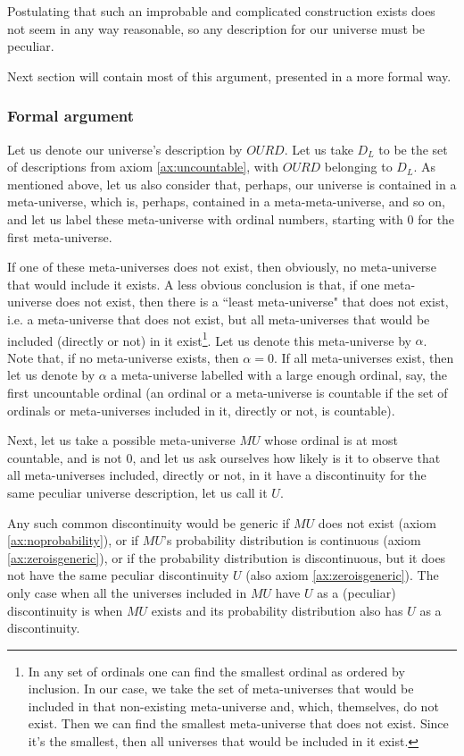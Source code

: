 \documentclass[a4paper
,draft
]{article}
\def\descriptions{D_L}
\def\our_description{OURD}
\newcommand{\ghilimele}[1]{``#1"}
\begin{document}
Postulating that such an improbable and complicated construction exists does
not seem in any way reasonable,
so any description for our universe must be peculiar.

Next section will contain most of this argument, presented in a more formal way.

\subsubsection{Formal argument}

Let us denote our universe's description by
$\our_description$. Let us take $\descriptions$ to be the set of descriptions from
axiom \ref{ax:uncountable}, with $\our_description$ belonging to $\descriptions$.
As mentioned above, let us also consider that, perhaps, our universe is
contained in a meta-universe, which is, perhaps, contained in
a meta-meta-universe, and so on, and let us label these meta-universe
with ordinal numbers, starting with $0$ for the first meta-universe.

If one of these meta-universes does not exist, then obviously, no meta-universe
that would include it exists. A less obvious conclusion is that, if one
meta-universe does not exist, then there is a \ghilimele{least meta-universe}
that does not exist, i.e. a meta-universe that does not exist,
but all meta-universes that would be
included (directly or not) in it exist\footnote{In any set of ordinals
one can find the smallest ordinal as ordered by inclusion.
In our case, we take the set of
meta-universes that would be included in that non-existing meta-universe and,
which, themselves, do not exist. Then we can find the smallest meta-universe
that does not exist. Since it's the smallest, then all universes that would
be included in it exist.}. Let us denote this meta-universe by $\alpha$. Note
that, if no meta-universe exists, then $\alpha=0$. If all
meta-universes exist, then let us denote by $\alpha$ a meta-universe labelled
with a large enough ordinal, say, the first uncountable ordinal
(an ordinal or a meta-universe is countable if the set of ordinals or
meta-universes included in it, directly or not, is countable).

Next, let us take a possible meta-universe $MU$ whose ordinal is at most
countable, and is not $0$, and let us
ask ourselves how likely is it to observe that all meta-universes
included, directly or not, in it have a discontinuity for
the same peculiar universe description, let us call it $U$.

Any such common discontinuity would be generic if $MU$ does not exist
(axiom \ref{ax:noprobability}), or if $MU$'s probability distribution
is continuous (axiom \ref{ax:zeroisgeneric}),
or if the probability distribution is discontinuous,
but it does not have the same peculiar discontinuity $U$
(also axiom \ref{ax:zeroisgeneric}).
The only case when all the universes included in $MU$ have $U$ as a
(peculiar) discontinuity is when $MU$ exists and its probability distribution
also has $U$ as a discontinuity.
\end{document}
